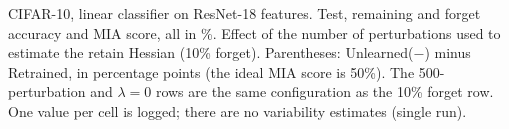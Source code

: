\begin{table}[t]
  \centering
  
  \caption{CIFAR-10, linear classifier on ResNet-18 features. Test, remaining and forget accuracy and MIA score, all in \%. Effect of the number of perturbations used to estimate the retain Hessian (10\% forget). Parentheses: Unlearned($-$) minus Retrained, in percentage points (the ideal MIA score is 50\%). The 500-perturbation and $\lambda{=}0$ rows are the same configuration as the 10\% forget row. One value per cell is logged; there are no variability estimates (single run).}
  \label{tab:perturb}
\end{table}
